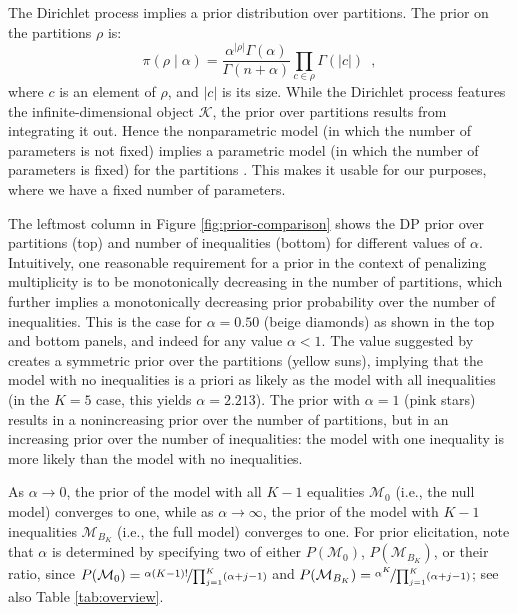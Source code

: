 \documentclass[11pt,a4paper]{article}
\theoremstyle{definition} %
\theoremstyle{case}
\begin{document}
The Dirichlet process implies a prior distribution over partitions. The prior on the partitions $\rho$ is:
\begin{equation}
    \pi(\rho \mid \alpha) = \frac{\alpha^{|\rho|}\Gamma(\alpha)}{\Gamma(n + \alpha)} \prod_{c \in \rho} \Gamma(|c|) \enspace ,
\end{equation}
where $c$ is an element of $\rho$, and $|c|$ is its size. While the Dirichlet process features the infinite-dimensional object $\mathcal{K}$, the prior over partitions results from integrating it out. Hence the nonparametric model (in which the number of parameters is not fixed) implies a parametric model (in which the number of parameters is fixed) for the partitions \parencite{quintana2006predictive}. This makes it usable for our purposes, where we have a fixed number of parameters.

The leftmost column in Figure \ref{fig:prior-comparison} shows the DP prior over partitions (top) and number of inequalities (bottom) for different values of $\alpha$. Intuitively, one reasonable requirement for a prior in the context of penalizing multiplicity is to be monotonically decreasing in the number of partitions, which further implies a monotonically decreasing prior probability over the number of inequalities. This is the case for $\alpha = 0.50$ (beige diamonds) as shown in the top and bottom panels, and indeed for any value $\alpha < 1$. The value suggested by \textcite{gopalan1998bayesian} creates a symmetric prior over the partitions (yellow suns), implying that the model with no inequalities is a priori as likely as the model with all inequalities  (in the $K = 5$ case, this yields $\alpha = 2.213$). The prior with $\alpha = 1$ (pink stars) results in a nonincreasing prior over the number of partitions, but in an increasing prior over the number of inequalities: the model with one inequality is more likely than the model with no inequalities.


As $\alpha \rightarrow 0$, the prior of the model with all $K - 1$ equalities $\mathcal{M}_0$ (i.e., the null model) converges to one, while as $\alpha \rightarrow \infty$, the prior of the model with $K - 1$ inequalities $\mathcal{M}_{B_K}$ (i.e., the full model) converges to one. For prior elicitation, \textcite{gopalan1998bayesian} note that $\alpha$ is determined by specifying two of either $P(\mathcal{M}_0)$, $P(\mathcal{M}_{B_K})$, or their ratio, since $P(\mathcal{M}_0) = \nicefrac{\alpha (K - 1)!}{\prod_{j = 1}^K (\alpha + j - 1)}$ and $P(\mathcal{M}_{B_K}) = \nicefrac{\alpha^K}{\prod_{j = 1}^K (\alpha + j - 1)}$; see also Table \ref{tab:overview}.
\end{document}
